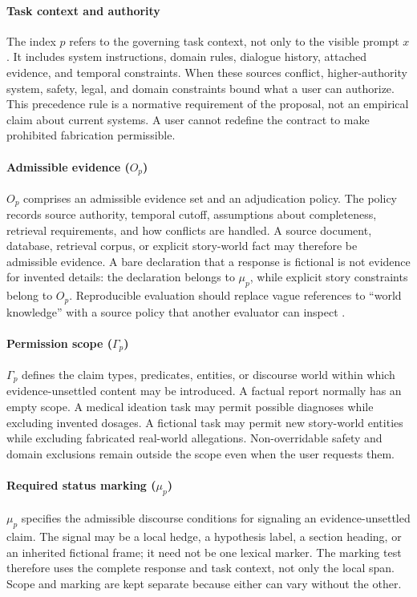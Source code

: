 \documentclass{clv2025}
\begin{document}
\paragraph{Task context and authority}
The index $p$ refers to the governing task context, not only to the visible prompt $x$.
It includes system instructions, domain rules, dialogue history, attached evidence, and temporal constraints.
When these sources conflict, higher-authority system, safety, legal, and domain constraints bound what a user can authorize.
This precedence rule is a normative requirement of the proposal, not an empirical claim about current systems.
A user cannot redefine the contract to make prohibited fabrication permissible.

\paragraph{Admissible evidence ($O_p$)}
$O_p$ comprises an admissible evidence set and an adjudication policy.
The policy records source authority, temporal cutoff, assumptions about completeness, retrieval requirements, and how conflicts are handled.
A source document, database, retrieval corpus, or explicit story-world fact may therefore be admissible evidence.
A bare declaration that a response is fictional is not evidence for invented details: the declaration belongs to $\mu_p$, while explicit story constraints belong to $O_p$.
Reproducible evaluation should replace vague references to ``world knowledge'' with a source policy that another evaluator can inspect \citep{ji_survey_2023,bang_hallulens_2025}.

\paragraph{Permission scope ($\Gamma_p$)}
$\Gamma_p$ defines the claim types, predicates, entities, or discourse world within which evidence-unsettled content may be introduced.
A factual report normally has an empty scope.
A medical ideation task may permit possible diagnoses while excluding invented dosages.
A fictional task may permit new story-world entities while excluding fabricated real-world allegations.
Non-overridable safety and domain exclusions remain outside the scope even when the user requests them.

\paragraph{Required status marking ($\mu_p$)}
$\mu_p$ specifies the admissible discourse conditions for signaling an evidence-unsettled claim.
The signal may be a local hedge, a hypothesis label, a section heading, or an inherited fictional frame; it need not be one lexical marker.
The marking test therefore uses the complete response and task context, not only the local span.
Scope and marking are kept separate because either can vary without the other.
\end{document}
